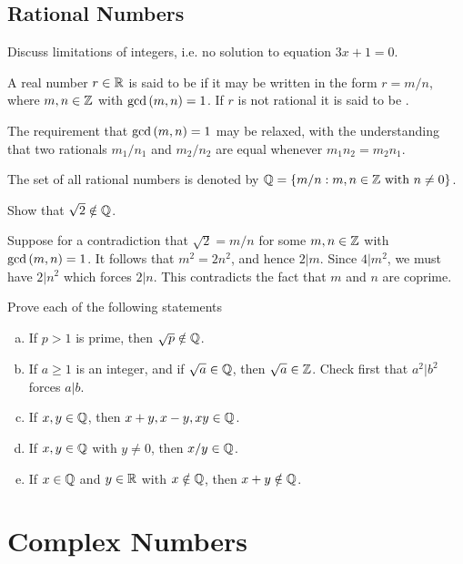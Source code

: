 \documentclass[11pt,fleqn,dvipsnames,usenames]{article}
\newcommand{\p}{\noindent}
\begin{document}
\subsection{Rational Numbers}

\p Discuss limitations of integers, i.e. no solution to equation $3x + 1 = 0$.
\vsp

\recall A real number $r\in\mathbb{R}$ is said to be  if it may be written in the form $r = m/n$, where $m,n\in\mathbb{Z}$ with $\text{gcd}\left(m, n\right) = 1$.  If $r$ is not rational it is said to be .
\vsp

\begin{remark}
The requirement that $\text{gcd}\left(m,n\right) = 1$ may be relaxed, with the understanding that two rationals $m_{1}/n_{1}$ and $m_{2}/n_{2}$ are equal whenever $m_{1}n_{2} = m_{2}n_{1}$.
\end{remark}

\notation The set of all rational numbers is denoted by $\mathbb{Q} = \left\{m/n:m,n\in\mathbb{Z}\text{ with } n\neq 0\right\}$.
\vsp

\begin{example}
Show that $\sqrt{2} \notin \mathbb{Q}$.
\end{example}

\solution Suppose for a contradiction that $\sqrt{2} = m/n$ for some $m,n\in\mathbb{Z}$ with $\text{gcd}\left(m, n\right) = 1$.  It follows that $m^2 = 2n^2$, and hence $2|m$.  Since $4|m^2$, we must have $2|n^2$ which forces $2|n$.  This contradicts the fact that $m$ and $n$ are coprime.
\vsp

\begin{exercise} Prove each of the following statements
\begin{enumerate}[(a)]
\item If $p > 1$ is prime, then $\sqrt{p}\notin\mathbb{Q}$.
\item If $a\geq 1$ is an integer, and if $\sqrt{a}\in \mathbb{Q}$, then $\sqrt{a}\in\mathbb{Z}$.  \hint Check first that $a^2|b^2$ forces $a|b$.
\item If $x,y\in\mathbb{Q}$, then $x+y, x-y, xy\in\mathbb{Q}$.
\item If $x,y\in\mathbb{Q}$ with $y\neq 0$, then $x/y\in\mathbb{Q}$.
\item If $x\in\mathbb{Q}$ and $y\in\mathbb{R}$ with $x\notin\mathbb{Q}$, then $x+y\notin\mathbb{Q}$.
\end{enumerate}
\end{exercise}

\section{Complex Numbers}
\end{document}

